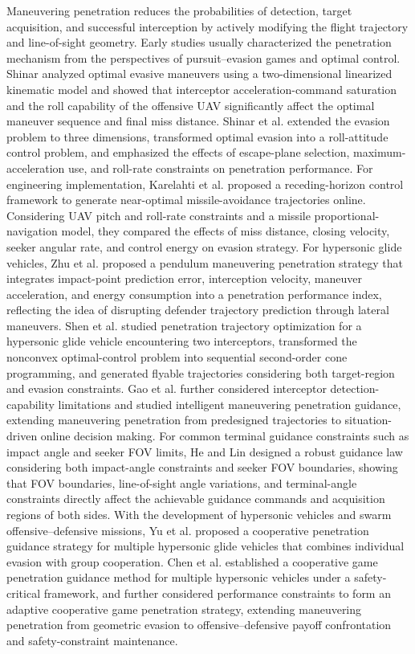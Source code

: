 \documentclass{cja}
\begin{document}
Maneuvering penetration reduces the probabilities of detection, target acquisition, and successful interception by actively modifying the flight trajectory and line-of-sight geometry. Early studies usually characterized the penetration mechanism from the perspectives of pursuit--evasion games and optimal control. Shinar\cite{Shinar1977JA} analyzed optimal evasive maneuvers using a two-dimensional linearized kinematic model and showed that interceptor acceleration-command saturation and the roll capability of the offensive UAV significantly affect the optimal maneuver sequence and final miss distance. Shinar et al.\cite{Shinar1979JGC} extended the evasion problem to three dimensions, transformed optimal evasion into a roll-attitude control problem, and emphasized the effects of escape-plane selection, maximum-acceleration use, and roll-rate constraints on penetration performance. For engineering implementation, Karelahti et al.\cite{Karelahti2007JGCD} proposed a receding-horizon control framework to generate near-optimal missile-avoidance trajectories online. Considering UAV pitch and roll-rate constraints and a missile proportional-navigation model, they compared the effects of miss distance, closing velocity, seeker angular rate, and control energy on evasion strategy. For hypersonic glide vehicles, Zhu et al.\cite{Zhu2018AST} proposed a pendulum maneuvering penetration strategy that integrates impact-point prediction error, interception velocity, maneuver acceleration, and energy consumption into a penetration performance index, reflecting the idea of disrupting defender trajectory prediction through lateral maneuvers. Shen et al.\cite{Shen2022AST} studied penetration trajectory optimization for a hypersonic glide vehicle encountering two interceptors, transformed the nonconvex optimal-control problem into sequential second-order cone programming, and generated flyable trajectories considering both target-region and evasion constraints. Gao et al.\cite{Gao2025AAS} further considered interceptor detection-capability limitations and studied intelligent maneuvering penetration guidance, extending maneuvering penetration from predesigned trajectories to situation-driven online decision making. For common terminal guidance constraints such as impact angle and seeker FOV limits, He and Lin\cite{He2015FOV} designed a robust guidance law considering both impact-angle constraints and seeker FOV boundaries, showing that FOV boundaries, line-of-sight angle variations, and terminal-angle constraints directly affect the achievable guidance commands and acquisition regions of both sides. With the development of hypersonic vehicles and swarm offensive--defensive missions, Yu et al.\cite{Yu2020CJA} proposed a cooperative penetration guidance strategy for multiple hypersonic glide vehicles that combines individual evasion with group cooperation. Chen et al.\cite{Chen2024CJA} established a cooperative game penetration guidance method for multiple hypersonic vehicles under a safety-critical framework, and further considered performance constraints to form an adaptive cooperative game penetration strategy\cite{Chen2024TAES}, extending maneuvering penetration from geometric evasion to offensive--defensive payoff confrontation and safety-constraint maintenance.
\end{document}

